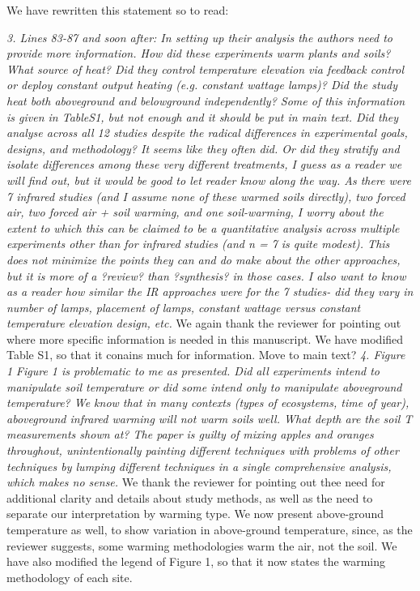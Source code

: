 \documentclass[11pt,a4paper]{letter}
\begin{document}
\begin{letter}{}
We have rewritten this statement so to read:


\emph{3. Lines 83-87 and soon after: In setting up their analysis the authors need to provide more information. How did these experiments warm plants and soils? What source of heat? Did they control temperature elevation via feedback control or deploy constant output heating (e.g. constant wattage lamps)? Did the study heat both aboveground and belowground independently? Some of this information is given in TableS1, but not enough and it should be put in main text. Did they analyse across all 12 studies despite the radical differences in experimental goals, designs, and methodology? It seems like they often did. Or did they stratify and isolate differences among these very different treatments, I guess as a reader we will find out, but it would be good to let reader know along the way. As there were 7 infrared studies (and I assume none of these warmed soils directly), two forced air, two forced air + soil warming, and one soil-warming, I worry about the extent to which this can be claimed to be a quantitative analysis across multiple experiments other than for infrared
studies (and n = 7 is quite modest). This does not minimize the points they can and do make about the other approaches, but it is more of a ?review? than ?synthesis? in those cases. I also want to know as a reader how similar the IR approaches were for the 7 studies- did they vary in number of lamps, placement of lamps, constant wattage versus constant temperature elevation design, etc.}
We again thank the reviewer for pointing out where more specific information is needed in this manuscript. We have modified Table S1, so that it conains much for information. Move to main text?
\emph{4. Figure 1}
\emph{Figure 1 is problematic to me as presented. Did all experiments intend to manipulate soil temperature or did some intend only to manipulate aboveground temperature? We know that in many contexts (types of ecosystems, time of year), aboveground infrared warming will not warm soils well. What depth are the soil T measurements shown at? The paper is guilty of mixing apples and oranges throughout, unintentionally painting different techniques with problems of other techniques by lumping different techniques in a single comprehensive analysis, which makes no sense.}
We thank the reviewer for pointing out thee need for additional clarity and details about study methods, as well as the need to separate our interpretation by warming type. We now present above-ground temperature as well, to show variation in above-ground temperature, since, as the reviewer suggests, some warming methodologies warm the air, not the soil. We have also modified the legend of Figure 1, so that it now  states the warming methodology of each site.



\end{letter}
\end{document}
